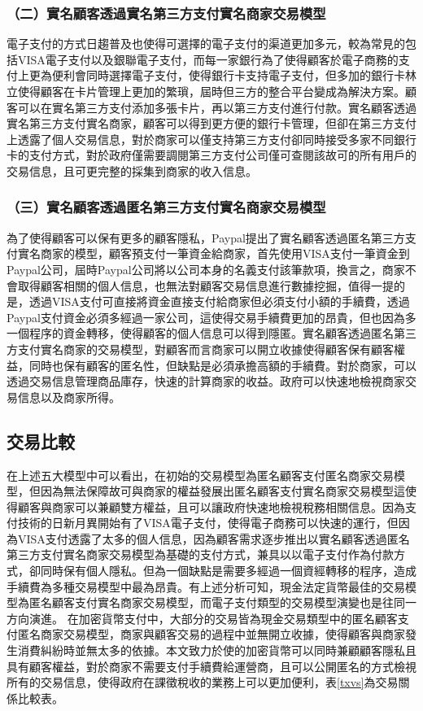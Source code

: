 		\subsubsection{（二）實名顧客透過實名第三方支付實名商家交易模型}
		電子支付的方式日趨普及也使得可選擇的電子支付的渠道更加多元，較為常見的包括VISA電子支付以及銀聯電子支付，而每一家銀行為了使得顧客於電子商務的支付上更為便利會同時選擇電子支付，使得銀行卡支持電子支付，但多加的銀行卡林立使得顧客在卡片管理上更加的繁瑣，屆時但三方的整合平台變成為解決方案。顧客可以在實名第三方支付添加多張卡片，再以第三方支付進行付款。實名顧客透過實名第三方支付實名商家，顧客可以得到更方便的銀行卡管理，但卻在第三方支付上透露了個人交易信息，對於商家可以僅支持第三方支付卻同時接受多家不同銀行卡的支付方式，對於政府僅需要調閱第三方支付公司僅可查閱該故可的所有用戶的交易信息，且可更完整的採集到商家的收入信息。
		
		\subsubsection{（三）實名顧客透過匿名第三方支付實名商家交易模型}
		為了使得顧客可以保有更多的顧客隱私，Paypal提出了實名顧客透過匿名第三方支付實名商家的模型，顧客預支付一筆資金給商家，首先使用VISA支付一筆資金到Paypal公司，屆時Paypal公司將以公司本身的名義支付該筆款項，換言之，商家不會取得顧客相關的個人信息，也無法對顧客交易信息進行數據挖掘，值得一提的是，透過VISA支付可直接將資金直接支付給商家但必須支付小額的手續費，透過Paypal支付資金必須多經過一家公司，這使得交易手續費更加的昂貴，但也因為多一個程序的資金轉移，使得顧客的個人信息可以得到隱匿。實名顧客透過匿名第三方支付實名商家的交易模型，對顧客而言商家可以開立收據使得顧客保有顧客權益，同時也保有顧客的匿名性，但缺點是必須承擔高額的手續費。對於商家，可以透過交易信息管理商品庫存，快速的計算商家的收益。政府可以快速地檢視商家交易信息以及商家所得。

		\subsection{交易比較}
		在上述五大模型中可以看出，在初始的交易模型為匿名顧客支付匿名商家交易模型，但因為無法保障故可與商家的權益發展出匿名顧客支付實名商家交易模型這使得顧客與商家可以兼顧雙方權益，且可以讓政府快速地檢視稅務相關信息。因為支付技術的日新月異開始有了VISA電子支付，使得電子商務可以快速的運行，但因為VISA支付透露了太多的個人信息，因為顧客需求逐步推出以實名顧客透過匿名第三方支付實名商家交易模型為基礎的支付方式，兼具以以電子支付作為付款方式，卻同時保有個人隱私。但為一個缺點是需要多經過一個資經轉移的程序，造成手續費為多種交易模型中最為昂貴。有上述分析可知，現金法定貨幣最佳的交易模型為匿名顧客支付實名商家交易模型，而電子支付類型的交易模型演變也是往同一方向演進。
		在加密貨幣支付中，大部分的交易皆為現金交易類型中的匿名顧客支付匿名商家交易模型，商家與顧客交易的過程中並無開立收據，使得顧客與商家發生消費糾紛時並無太多的依據。本文致力於使的加密貨幣可以同時兼顧顧客隱私且具有顧客權益，對於商家不需要支付手續費給運營商，且可以公開匿名的方式檢視所有的交易信息，使得政府在課徵稅收的業務上可以更加便利，表\ref{txvs}為交易關係比較表。


